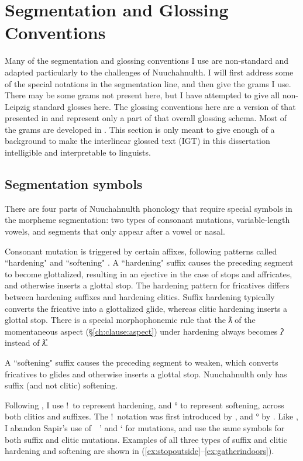 \chapter{Segmentation and Glossing Conventions} \label{appendix:glossing}

Many of the segmentation and glossing conventions I use are non-standard and adapted particularly to the challenges of Nuuchahnulth. I will first address some of the special notations in the segmentation line, and then give the grams I use. There may be some grams not present here, but I have attempted to give all non-Leipzig standard \citep{leipzig} glosses here. The glossing conventions here are a version of that presented in \citet{inmanwerle2016a} and represent only a part of that overall glossing schema. Most of the grams are developed in \citet{werle2016}. This section is only meant to give enough of a background to make the interlinear glossed text (IGT) in this dissertation intelligible and interpretable to linguists.

\section{Segmentation symbols}

There are four parts of Nuuchahnulth phonology that require special symbols in the morpheme segmentation: two types of consonant mutations, variable-length vowels, and segments that only appear after a vowel or nasal.

Consonant mutation is triggered by certain affixes, following patterns called ``hardening" and ``softening" \citep{werle2010}. A ``hardening" suffix causes the preceding segment to become glottalized, resulting in an ejective in the case of stops and affricates, and otherwise inserts a glottal stop. The hardening pattern for fricatives differs between hardening suffixes and hardening clitics. Suffix hardening typically converts the fricative into a glottalized glide, whereas clitic hardening inserts a glottal stop. There is a special morphophonemic rule that the \textit{ƛ} of the momentaneous aspect (\S\ref{ch:clause:aspect}) under hardening always becomes \textit{ʔ} instead of \textit{ƛ̓}.

A ``softening" suffix causes the preceding segment to weaken, which converts fricatives to glides and otherwise inserts a glottal stop. Nuuchahnulth only has suffix (and not clitic) softening.

Following \citet{werle2010}, I use !\ to represent hardening, and ° to represent softening, across both clitics and suffixes. The !\ notation was first introduced by \citet{boas1900}, and ° by \citet{jacobsen1973}. Like \citeauthor{werle2010}, I abandon Sapir's use of\ \ ' and ` for mutations, and use the same symbols for both suffix and clitic mutations. Examples of all three types of suffix and clitic hardening and softening are shown in (\ref{ex:stopoutside}--\ref{ex:gatherindoors}).

